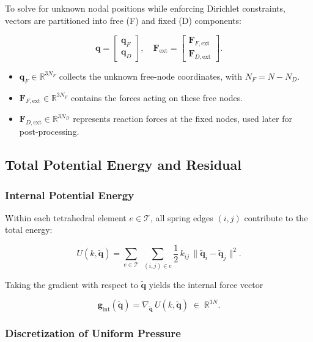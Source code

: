 \documentclass{article}
\begin{document}
To solve for unknown nodal positions while enforcing Dirichlet constraints, vectors are partitioned into free (F) and fixed (D) components:

$$
  \mathbf q = \begin{bmatrix}\mathbf q_F\\[4pt]\mathbf q_D\end{bmatrix},
  \quad
  \mathbf F_{\mathrm{ext}}
  = \begin{bmatrix}\mathbf F_{F,\mathrm{ext}}\\[4pt]\mathbf F_{D,\mathrm{ext}}\end{bmatrix}.
$$

\begin{itemize}
  \item $\mathbf q_F\in\mathbb R^{3N_F}$ collects the unknown free-node coordinates, with $N_F=N-N_D$.
  \item $\mathbf F_{F,\mathrm{ext}}\in\mathbb R^{3N_F}$ contains the forces acting on these free nodes.
  \item $\mathbf F_{D,\mathrm{ext}}\in\mathbb R^{3N_D}$ represents reaction forces at the fixed nodes, used later for post-processing.
\end{itemize}




\subsection{Total Potential Energy and Residual}

\subsubsection{Internal Potential Energy}

Within each tetrahedral element $e\in\mathcal T$, all spring edges $(i,j)$ contribute to the total energy:

$$
  U(k,\tilde{\mathbf q})
  = \sum_{e\in\mathcal T}\;\sum_{(i,j)\in e}
    \frac12\,k_{ij}\,\|\tilde{\mathbf q}_i - \tilde{\mathbf q}_j\|^2.
$$

Taking the gradient with respect to $\tilde{\mathbf q}$ yields the internal force vector

$$
  \mathbf g_{\mathrm{int}}(\tilde{\mathbf q})
  = \nabla_{\tilde{\mathbf q}}\,U(k,\tilde{\mathbf q})
  \;\in\;\mathbb R^{3N}.
$$

\subsubsection{Discretization of Uniform Pressure}
\end{document}
